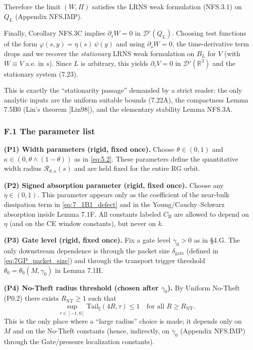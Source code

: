 \documentclass[
  11pt,
]{article}
\begin{document}
Therefore the limit \((W,\Pi)\) satisfies the LRNS weak formulation (NFS.3.1) on \(Q_L\) (Appendix NFS.IMP).

Finally, Corollary NFS.3C implies \(\partial_s W=0\) in \(\mathcal D'(Q_L)\). Choosing test functions of the form \(\varphi(s,y)=\eta(s)\,\psi(y)\) and using \(\partial_s W=0\), the time-derivative term drops and we recover the \emph{stationary} LRNS weak formulation on \(B_L\) for \(V\) (with \(W\equiv V\) a.e. in \(s\)). Since \(L\) is arbitrary, this yields \(\partial_\tau V=0\) in \(\mathcal D'(\mathbb R^3)\) and the stationary system (7.23).

This is exactly the ``stationarity passage'' demanded by a strict reader: the only analytic inputs are the uniform suitable bounds (7.22A), the compactness Lemma 7.5B0 (Lin's theorem {[}Lin98{]}), and the elementary stability Lemma NFS.3A.

\hypertarget{f.1-the-parameter-list}{%
\subsubsection{F.1 The parameter list}\label{f.1-the-parameter-list}}

\textbf{(P1) Width parameters (rigid, fixed once).} Choose \(\theta\in(0,1)\) and \(\kappa\in(0,\theta\wedge(1-\theta))\) as in \eqref{eq:5.2}. These parameters define the quantitative width radius \(\mathcal R_{\theta,\kappa}(s)\) and are held fixed for the entire RG orbit.

\textbf{(P2) Signed absorption parameter (rigid, fixed once).} Choose any \(\eta\in(0,1)\). This parameter appears only as the coefficient of the near-bulk dissipation term in \eqref{eq:7_1B1_defect} and in the Young/Cauchy--Schwarz absorption inside Lemma 7.1F. All constants labeled \(C_{\mathrm{B}}\) are allowed to depend on \(\eta\) (and on the CE window constants), but never on \(k\).

\textbf{(P3) Gate level (rigid, fixed once).} Fix a gate level \(\gamma_0>0\) as in §4.G. The only downstream dependence is through the packet size \(\delta_{\mathrm{gate}}\) (defined in \eqref{eq:7GP_packet_size}) and through the transport trigger threshold \(\theta_0=\theta_0(M,\gamma_0)\) in Lemma 7.1H.

\textbf{(P4) No-Theft radius threshold (chosen after \(\gamma_0\)).} By Uniform No-Theft (P0.2) there exists \(R_{\mathrm{NT}}\ge 1\) such that \[
\sup_{\tau\in[-1,0]}\mathrm{Tail}_\sharp(4R,\tau)\le 1
\quad\text{for all }R\ge R_{\mathrm{NT}}.
\] This is the only place where a ``large radius'' choice is made; it depends only on \(M\) and on the No-Theft constants (hence, indirectly, on \(\gamma_0\) (Appendix NFS.IMP) through the Gate/pressure localization constants).
\end{document}
